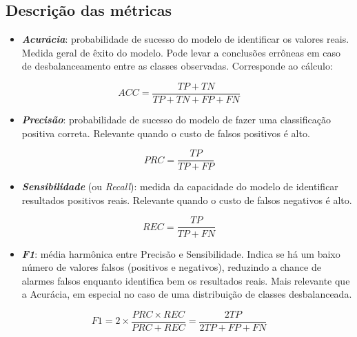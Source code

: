 \documentclass[]{article}
\begin{document}
\hypertarget{header-n1120}{%
\subsection{Descrição das métricas}\label{header-n1120}}

\begin{itemize}
\item
  \textbf{\emph{Acurácia}}: probabilidade de sucesso do modelo de
  identificar os valores reais. Medida geral de êxito do modelo. Pode
  levar a conclusões errôneas em caso de desbalanceamento entre as
  classes observadas. Corresponde ao cálculo:
\end{itemize}

\[ACC = \frac{TP + TN}{TP + TN + FP + FN}\]

\begin{itemize}
\item
  \textbf{\emph{Precisão}}: probabilidade de sucesso do modelo de fazer
  uma classificação positiva correta. Relevante quando o custo de falsos
  positivos é alto.
\end{itemize}

\[PRC = \frac{TP}{TP + FP}\]

\begin{itemize}
\item
  \textbf{\emph{Sensibilidade}} (ou \emph{Recall}): medida da capacidade
  do modelo de identificar resultados positivos reais. Relevante quando
  o custo de falsos negativos é alto.
\end{itemize}

\[REC = \frac{TP}{TP + FN}\]

\begin{itemize}
\item
  \textbf{\emph{F1}}: média harmônica entre Precisão e Sensibilidade.
  Indica se há um baixo número de valores falsos (positivos e
  negativos), reduzindo a chance de alarmes falsos enquanto identifica
  bem os resultados reais. Mais relevante que a Acurácia, em especial no
  caso de uma distribuição de classes desbalanceada.
\end{itemize}

\[F1 =  2\times\frac{PRC \times REC}{PRC + REC}   = \frac{2TP}{2TP + FP + FN}\]
\end{document}
